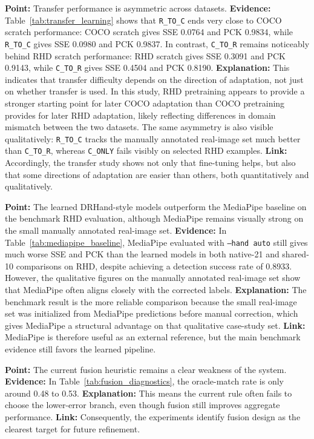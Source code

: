 \documentclass[10pt,letterpaper]{article}
\begin{document}
\medskip
\noindent\textbf{Point:} Transfer performance is asymmetric across datasets.
\textbf{Evidence:} Table~\ref{tab:transfer_learning} shows that \texttt{R\_TO\_C} ends very close to COCO scratch performance: COCO scratch gives SSE 0.0764 and PCK 0.9834, while \texttt{R\_TO\_C} gives SSE 0.0980 and PCK 0.9837. In contrast, \texttt{C\_TO\_R} remains noticeably behind RHD scratch performance: RHD scratch gives SSE 0.3091 and PCK 0.9143, while \texttt{C\_TO\_R} gives SSE 0.4504 and PCK 0.8190.
\textbf{Explanation:} This indicates that transfer difficulty depends on the direction of adaptation, not just on whether transfer is used. In this study, RHD pretraining appears to provide a stronger starting point for later COCO adaptation than COCO pretraining provides for later RHD adaptation, likely reflecting differences in domain mismatch between the two datasets. The same asymmetry is also visible qualitatively: \texttt{R\_TO\_C} tracks the manually annotated real-image set much better than \texttt{C\_TO\_R}, whereas \texttt{C\_ONLY} fails visibly on selected RHD examples.
\textbf{Link:} Accordingly, the transfer study shows not only that fine-tuning helps, but also that some directions of adaptation are easier than others, both quantitatively and qualitatively.

\medskip
\noindent\textbf{Point:} The learned DRHand-style models outperform the MediaPipe baseline on the benchmark RHD evaluation, although MediaPipe remains visually strong on the small manually annotated real-image set.
\textbf{Evidence:} In Table~\ref{tab:mediapipe_baseline}, MediaPipe evaluated with \texttt{--hand auto} still gives much worse SSE and PCK than the learned models in both native-21 and shared-10 comparisons on RHD, despite achieving a detection success rate of 0.8933. However, the qualitative figures on the manually annotated real-image set show that MediaPipe often aligns closely with the corrected labels.
\textbf{Explanation:} The benchmark result is the more reliable comparison because the small real-image set was initialized from MediaPipe predictions before manual correction, which gives MediaPipe a structural advantage on that qualitative case-study set.
\textbf{Link:} MediaPipe is therefore useful as an external reference, but the main benchmark evidence still favors the learned pipeline.

\medskip
\noindent\textbf{Point:} The current fusion heuristic remains a clear weakness of the system.
\textbf{Evidence:} In Table~\ref{tab:fusion_diagnostics}, the oracle-match rate is only around 0.48 to 0.53.
\textbf{Explanation:} This means the current rule often fails to choose the lower-error branch, even though fusion still improves aggregate performance.
\textbf{Link:} Consequently, the experiments identify fusion design as the clearest target for future refinement.
\end{document}
